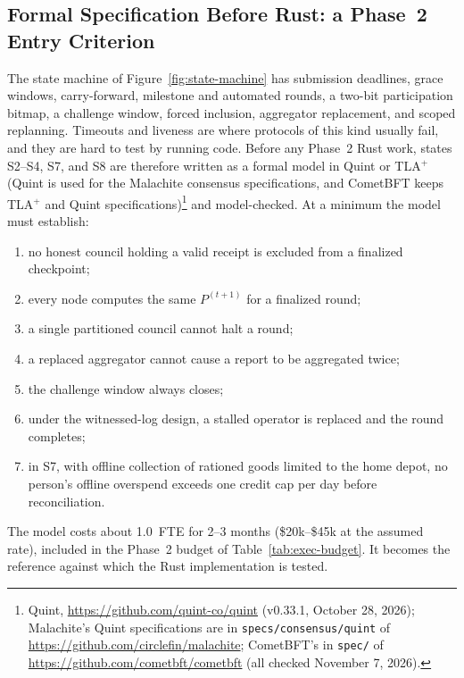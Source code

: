 \documentclass[10pt,twoside,openany]{book}
\theoremstyle{dpepstyle}
\begin{document}
\subsection{Formal Specification Before Rust: a Phase~2 Entry Criterion}
\label{sec:formal-model}
The state machine of Figure~\ref{fig:state-machine} has submission deadlines, grace windows, carry-forward, milestone and automated rounds, a two-bit participation bitmap, a challenge window, forced inclusion, aggregator replacement, and scoped replanning. Timeouts and liveness are where protocols of this kind usually fail, and they are hard to test by running code. Before any Phase~2 Rust work, states S2--S4, S7, and S8 are therefore written as a formal model in Quint or TLA$^+$ (Quint is used for the Malachite consensus specifications, and CometBFT keeps TLA$^+$ and Quint specifications)\footnote{Quint, \url{https://github.com/quint-co/quint} (v0.33.1, October 28, 2026); Malachite's Quint specifications are in \texttt{specs/consensus/quint} of \url{https://github.com/circlefin/malachite}; CometBFT's in \texttt{spec/} of \url{https://github.com/cometbft/cometbft} (all checked November 7, 2026).} and model-checked. At a minimum the model must establish:
\begin{enumerate}[leftmargin=1.6em,itemsep=1pt]
  \item no honest council holding a valid receipt is excluded from a finalized checkpoint;
  \item every node computes the same $P^{(t+1)}$ for a finalized round;
  \item a single partitioned council cannot halt a round;
  \item a replaced aggregator cannot cause a report to be aggregated twice;
  \item the challenge window always closes;
  \item under the witnessed-log design, a stalled operator is replaced and the round completes;
  \item in S7, with offline collection of rationed goods limited to the home depot, no person's offline overspend exceeds one credit cap per day before reconciliation.
\end{enumerate}
The model costs about 1.0~FTE for 2--3 months (\$20k--\$45k at the assumed rate), included in the Phase~2 budget of Table~\ref{tab:exec-budget}. It becomes the reference against which the Rust implementation is tested.
\end{document}
